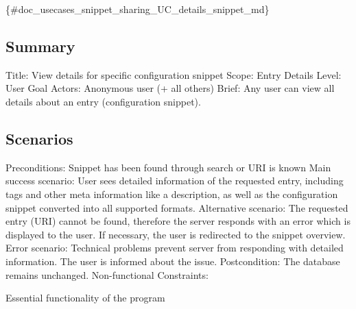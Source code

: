\{\#doc\+\_\+usecases\+\_\+snippet\+\_\+sharing\+\_\+\+U\+C\+\_\+details\+\_\+snippet\+\_\+md\}

\subsection*{Summary}

Title\+: View details for specific configuration snippet Scope\+: Entry Details Level\+: User Goal Actors\+: Anonymous user (+ all others) Brief\+: Any user can view all details about an entry (configuration snippet).

\subsection*{Scenarios}

Preconditions\+: Snippet has been found through search or U\+R\+I is known Main success scenario\+: User sees detailed information of the requested entry, including tags and other meta information like a description, as well as the configuration snippet converted into all supported formats. Alternative scenario\+: The requested entry (U\+R\+I) cannot be found, therefore the server responds with an error which is displayed to the user. If necessary, the user is redirected to the snippet overview. Error scenario\+: Technical problems prevent server from responding with detailed information. The user is informed about the issue. Postcondition\+: The database remains unchanged. Non-\/functional Constraints\+:
\begin{DoxyItemize}
\item Essential functionality of the program 
\end{DoxyItemize}